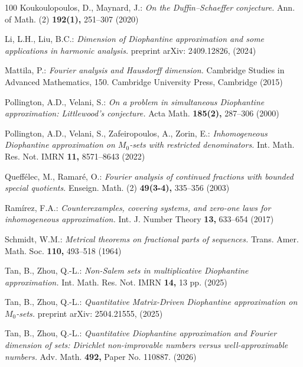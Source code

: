 \documentclass[12pt,a4paper,twoside]{article}
\begin{document}
\begin{thebibliography}{100}
 Koukoulopoulos,  D.,   Maynard,  J.:
\textit{On the Duffin--Schaeffer conjecture.}
Ann. of Math. (2) {\bf 192(1),}  251--307 (2020)




 Li, L.H.,  Liu,  B.C.:
\textit{Dimension of Diophantine approximation and some applications in harmonic analysis.}
 preprint arXiv: 2409.12826, (2024)




 Mattila, P.:
\textit{Fourier analysis and Hausdorff dimension.} Cambridge Studies in Advanced Mathematics, 150. Cambridge University Press, Cambridge  (2015)




 Pollington, A.D.,  Velani, S.:
\textit{On a problem in simultaneous Diophantine approximation: Littlewood’s conjecture.}
Acta Math. {\bf 185(2),} 287--306 (2000)



Pollington, A.D.,  Velani, S.,  Zafeiropoulos, A.,  Zorin, E.:
\textit{Inhomogeneous Diophantine approximation on $M_0$-sets with restricted denominators.}
Int. Math. Res. Not. IMRN  {\bf 11,} 8571–8643 (2022)




 Queff\'{e}lec, M.,   Ramar\'{e}, O.:
\textit{Fourier analysis of continued fractions with bounded special quotients.}
Enseign. Math. (2) {\bf 49(3-4),}  335--356 (2003)



 Ram\'{i}rez, F.A.:
\textit{Counterexamples, covering systems, and zero-one laws for
inhomogeneous approximation.}
Int. J. Number Theory {\bf 13,}  633--654 (2017)



 Schmidt, W.M.:
\textit{Metrical theorems on fractional parts of sequences.}
Trans. Amer. Math. Soc. {\bf 110,}  493--518 (1964)



 Tan, B.,  Zhou,  Q.-L.:
\textit{Non-Salem sets in multiplicative Diophantine approximation.}
Int. Math. Res. Not. IMRN  {\bf 14,} 13 pp. (2025)




Tan, B.,  Zhou,  Q.-L.:
\textit{Quantitative Matrix-Driven Diophantine approximation on $M_0$-sets.}
 preprint arXiv: 2504.21555, (2025)


Tan, B.,  Zhou,  Q.-L.:
\textit{Quantitative Diophantine approximation and Fourier dimension of sets: Dirichlet non-improvable numbers versus well-approximable numbers.}
Adv. Math. {\bf 492,}  Paper No. 110887. (2026)




\end{thebibliography}
\end{document}
